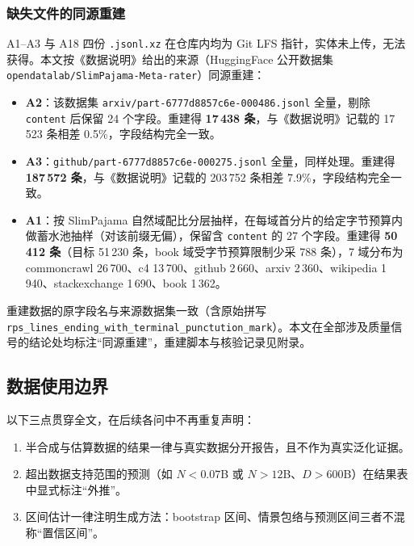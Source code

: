 \subsubsection{缺失文件的同源重建}
\label{sec:q1_rebuild}

A1--A3 与 A18 四份 \texttt{.jsonl.xz} 在仓库内均为 Git LFS 指针，实体未上传，无法获得。本文按《数据说明》给出的来源（HuggingFace 公开数据集 \texttt{opendatalab/SlimPajama-Meta-rater}\cite{zhuang2025metarater}）同源重建：

\begin{itemize}[leftmargin=2em,itemsep=2pt]
\item \textbf{A2}：该数据集 \texttt{arxiv/part-6777d8857c6e-000486.jsonl} 全量，剔除 \texttt{content} 后保留 24 个字段。重建得 \textbf{17\,438 条}，与《数据说明》记载的 17\,523 条相差 0.5\%，字段结构完全一致。
\item \textbf{A3}：\texttt{github/part-6777d8857c6e-000275.jsonl} 全量，同样处理。重建得 \textbf{187\,572 条}，与《数据说明》记载的 203\,752 条相差 7.9\%，字段结构完全一致。
\item \textbf{A1}：按 SlimPajama 自然域配比分层抽样，在每域首分片的给定字节预算内做蓄水池抽样（对该前缀无偏），保留含 \texttt{content} 的 27 个字段。重建得 \textbf{50\,412 条}（目标 51\,230 条，book 域受字节预算限制少采 788 条），7 域分布为 commoncrawl 26\,700、c4 13\,700、github 2\,660、arxiv 2\,360、wikipedia 1\,940、stackexchange 1\,690、book 1\,362。
\end{itemize}

重建数据的原字段名与来源数据集一致（含原始拼写 \texttt{rps\_lines\_ending\_with\_terminal\_punctution\_mark}）。本文在全部涉及质量信号的结论处均标注``同源重建''，重建脚本与核验记录见附录。

\subsection{数据使用边界}

以下三点贯穿全文，在后续各问中不再重复声明：

\begin{enumerate}[leftmargin=2em,itemsep=2pt]
\item 半合成与估算数据的结果一律与真实数据分开报告，且不作为真实泛化证据。
\item 超出数据支持范围的预测（如 $N<0.07$B 或 $N>12$B、$D>600$B）在结果表中显式标注``外推''。
\item 区间估计一律注明生成方法：bootstrap 区间、情景包络与预测区间三者不混称``置信区间''。
\end{enumerate}
